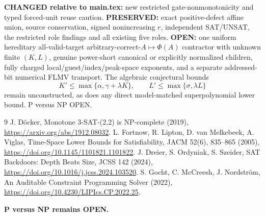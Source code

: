 \documentclass[11pt]{article}
\begin{document}
\par\noindent\textbf{CHANGED relative to main.tex:} new restricted gate-nonmonotonicity and typed forced-unit reuse caution. \textbf{PRESERVED:} exact positive-defect affine union, source conservation, signed nonincreasing $r$, independent SAT/UNSAT, the restricted role findings and all existing five roles. \textbf{OPEN:} one uniform hereditary all-valid-target arbitrary-correct-$A\mapsto\Phi(A)$ contractor with unknown finite $(K,L)$, genuine power-short canonical or explicitly normalized children, fully charged local/guest/index/peak-space exponents, and a separate addressed-bit numerical FLMV transport. The algebraic conjectural bounds
\[
K'\le\max\{\alpha,\gamma+\lambda K\},\qquad
L'\le\max\{\sigma,\lambda L\}
\]
remain unconstructed, as does any direct model-matched superpolynomial lower bound. P versus NP OPEN.
\begin{thebibliography}{9}
 J. D\"ocker, Monotone 3-SAT-(2,2) is NP-complete (2019), \url{https://arxiv.org/abs/1912.08032}.
 L. Fortnow, R. Lipton, D. van Melkebeek, A. Viglas, Time-Space Lower Bounds for Satisfiability, JACM 52(6), 835--865 (2005), \url{https://doi.org/10.1145/1101821.1101822}.
 J. Dreier, S. Ordyniak, S. Szeider, SAT Backdoors: Depth Beats Size, JCSS 142 (2024), \url{https://doi.org/10.1016/j.jcss.2024.103520}.
 S. Gocht, C. McCreesh, J. Nordstr\"om, An Auditable Constraint Programming Solver (2022), \url{https://doi.org/10.4230/LIPIcs.CP.2022.25}.
\end{thebibliography}
\noindent\textbf{P versus NP remains OPEN.}
\end{document}
